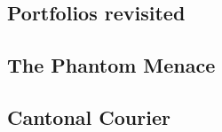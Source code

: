 \documentclass[10pt,a4paper,twoside]{report}
\begin{document}
\newpage
\subsection*{Portfolios revisited}
\begin{keywords}\end{keywords}


\newpage
\subsection*{The Phantom Menace}
\begin{keywords}\end{keywords}



\newpage
\subsection*{Cantonal Courier}
\begin{keywords}\end{keywords}



\printindex
\end{document}
